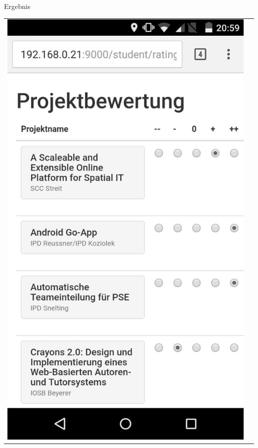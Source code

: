 \documentclass[18pt]{beamer}
\begin{document}
\begin{frame}{Ergebnis}
{{\begin{tabular}{lr}
	\includegraphics[height=0.7\paperheight]{bilder/androidScreenshot.png} &

\end{tabular}}}
\end{frame}
\end{document}
